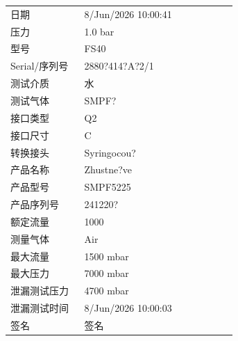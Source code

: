 \documentclass[UTF8,10pt,a4paper,fontset=fandol]{ctexart}
\newcommand{\fieldvalue}[1]{#1}
\newcommand{\handwritten}[1]{#1}
\begin{document}
\begin{tabular}{@{}p{0.30\linewidth}p{0.62\linewidth}@{}}
日期 &
\fieldvalue{8/Jun/2026 10:00:41}
\\
压力 &
\fieldvalue{1.0 bar}
\\
型号 &
\fieldvalue{FS40}
\\
Serial/序列号 &
\fieldvalue{2880?414?A?2/1}
\\
测试介质 &
\fieldvalue{水}
\\
测试气体 &
\fieldvalue{SMPF?}
\\
接口类型 &
\fieldvalue{Q2}
\\
接口尺寸 &
\fieldvalue{C}
\\
转换接头 &
\fieldvalue{Syringocou?}
\\
产品名称 &
\fieldvalue{Zhustne?ve}
\\
产品型号 &
\fieldvalue{SMPF5225}
\\
产品序列号 &
\fieldvalue{241220?}
\\
额定流量 &
\fieldvalue{1000}
\\
测量气体 &
\fieldvalue{Air}
\\
最大流量 &
\fieldvalue{1500 mbar}
\\
最大压力 &
\fieldvalue{7000 mbar}
\\
泄漏测试压力 &
\fieldvalue{4700 mbar}
\\
泄漏测试时间 &
\fieldvalue{8/Jun/2026 10:00:03}
\\
签名 &
\fieldvalue{\handwritten{签名}}
\end{tabular}
\end{document}

